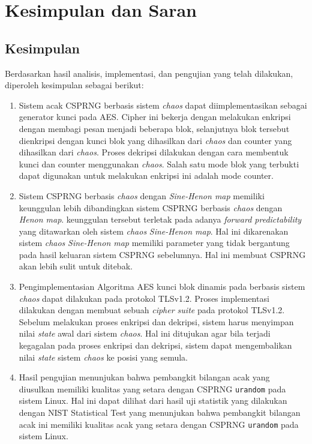 \chapter{Kesimpulan dan Saran}

\section{Kesimpulan}
Berdasarkan hasil analisis, implementasi, dan pengujian yang telah dilakukan, diperoleh kesimpulan sebagai berikut:
\begin{enumerate}
  \item Sistem acak CSPRNG berbasis sistem \emph{chaos} dapat diimplementasikan sebagai generator kunci pada AES. Cipher ini bekerja dengan melakukan enkripsi dengan membagi pesan menjadi beberapa blok, selanjutnya blok tersebut dienkripsi dengan kunci blok yang dihasilkan dari \emph{chaos} dan counter yang dihasilkan dari \emph{chaos}. Proses dekripsi dilakukan dengan cara membentuk kunci dan counter menggunakan \emph{chaos}. Salah satu mode blok yang terbukti dapat digunakan untuk melakukan enkripsi ini adalah mode counter.
  \item Sistem CSPRNG berbasis \emph{chaos} dengan \emph{Sine-Henon map} memiliki keunggulan lebih dibandingkan sistem CSPRNG berbasis \emph{chaos} dengan \emph{Henon map}. keunggulan tersebut terletak pada adanya \emph{forward predictability} yang ditawarkan oleh sistem \emph{chaos} \emph{Sine-Henon map}. Hal ini dikarenakan sistem \emph{chaos} \emph{Sine-Henon map} memiliki parameter yang tidak bergantung pada hasil keluaran sistem CSPRNG sebelumnya. Hal ini membuat CSPRNG akan lebih sulit untuk ditebak.
  \item Pengimplementasian Algoritma AES kunci blok dinamis pada berbasis sistem \emph{chaos} dapat dilakukan pada protokol TLSv1.2. Proses implementasi dilakukan dengan membuat sebuah \emph{cipher suite} pada protokol TLSv1.2. Sebelum melakukan proses enkripsi dan dekripsi, sistem harus menyimpan nilai \emph{state} awal dari sistem \emph{chaos}. Hal ini ditujukan agar bila terjadi kegagalan pada proses enkripsi dan dekripsi, sistem dapat mengembalikan nilai \emph{state} sistem \emph{chaos} ke posisi yang semula.
  \item Hasil pengujian menunjukan bahwa pembangkit bilangan acak yang diusulkan memiliki kualitas yang setara dengan CSPRNG \texttt{urandom} pada sistem Linux. Hal ini dapat dilihat dari hasil uji statistik yang dilakukan dengan NIST Statistical Test yang menunjukan bahwa pembangkit bilangan acak ini memiliki kualitas acak yang setara dengan CSPRNG \texttt{urandom} pada sistem Linux.

\end{enumerate}
